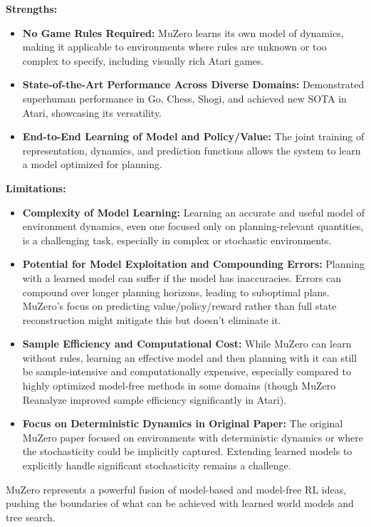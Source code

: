 \documentclass[11pt,a4paper]{article}
\begin{document}
\textbf{Strengths:}
\begin{itemize}
    \item \textbf{No Game Rules Required:} MuZero learns its own model of dynamics, making it applicable to environments where rules are unknown or too complex to specify, including visually rich Atari games.
    \item \textbf{State-of-the-Art Performance Across Diverse Domains:} Demonstrated superhuman performance in Go, Chess, Shogi, and achieved new SOTA in Atari, showcasing its versatility.
    \item \textbf{End-to-End Learning of Model and Policy/Value:} The joint training of representation, dynamics, and prediction functions allows the system to learn a model optimized for planning.
\end{itemize}

\textbf{Limitations:}
\begin{itemize}
    \item \textbf{Complexity of Model Learning:} Learning an accurate and useful model of environment dynamics, even one focused only on planning-relevant quantities, is a challenging task, especially in complex or stochastic environments.
    \item \textbf{Potential for Model Exploitation and Compounding Errors:} Planning with a learned model can suffer if the model has inaccuracies. Errors can compound over longer planning horizons, leading to suboptimal plans. MuZero's focus on predicting value/policy/reward rather than full state reconstruction might mitigate this but doesn't eliminate it.
    \item \textbf{Sample Efficiency and Computational Cost:} While MuZero can learn without rules, learning an effective model and then planning with it can still be sample-intensive and computationally expensive, especially compared to highly optimized model-free methods in some domains (though MuZero Reanalyze improved sample efficiency significantly in Atari).
    \item \textbf{Focus on Deterministic Dynamics in Original Paper:} The original MuZero paper focused on environments with deterministic dynamics or where the stochasticity could be implicitly captured. Extending learned models to explicitly handle significant stochasticity remains a challenge.
\end{itemize}
MuZero represents a powerful fusion of model-based and model-free RL ideas, pushing the boundaries of what can be achieved with learned world models and tree search.
\end{document}
